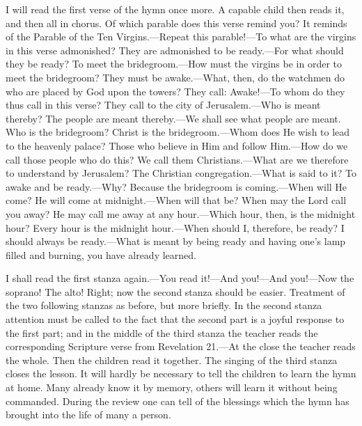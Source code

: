 I will read the first verse of the hymn once more. A capable child then reads it, and then all in chorus. Of which parable does this verse remind you? It reminds of the Parable of the Ten Virgins.—Repeat this parable!—To what are the virgins in this verse admonished? They are admonished to be ready.—For what should they be ready? To meet the bridegroom.—How must the virgins be in order to meet the bridegroom? They must be awake.—What, then, do the watchmen do who are placed by God upon the towers? They call: Awake!—To whom do they thus call in this verse? They call to the city of Jerusalem.—Who is meant thereby? The people are meant thereby.—We shall see what people are meant. Who is the bridegroom? Christ is the bridegroom.—Whom does He wish to lead to the heavenly palace? Those who believe in Him and follow Him.—How do we call
those people who do this? We call them Christians.—What are we therefore to understand by Jerusalem? The Christian congregation.—What is said to it? To awake and be ready.—Why? Because the bridegroom is coming.—When will He come? He will come at midnight.—When will that be? When may the Lord call you away? He may call me away at any hour.—Which hour, then, is the midnight hour? Every hour is the midnight hour.—When should I, therefore, be ready? I should always be ready.—What is meant by being ready and having one’s lamp filled and burning, you have already learned.

I shall read the first stanza again.—You read it!—And you!—And you!—Now the soprano! The alto! Right; now the second stanza should be easier. Treatment of the two following stanzas as before, but more briefly. In the second stanza attention must be called to the fact that the second part is a joyful response to the first part; and in the middle of the third stanza the teacher reads the corresponding Scripture verse from Revelation 21.—At the close the teacher reads the whole. Then the children read it together. The singing of the third stanza closes the lesson. It will hardly be necessary to tell the children to learn the hymn at home. Many already know it by memory, others will learn it without being commanded. During the review one can tell of the blessings which the hymn has brought into the life of many a person.

